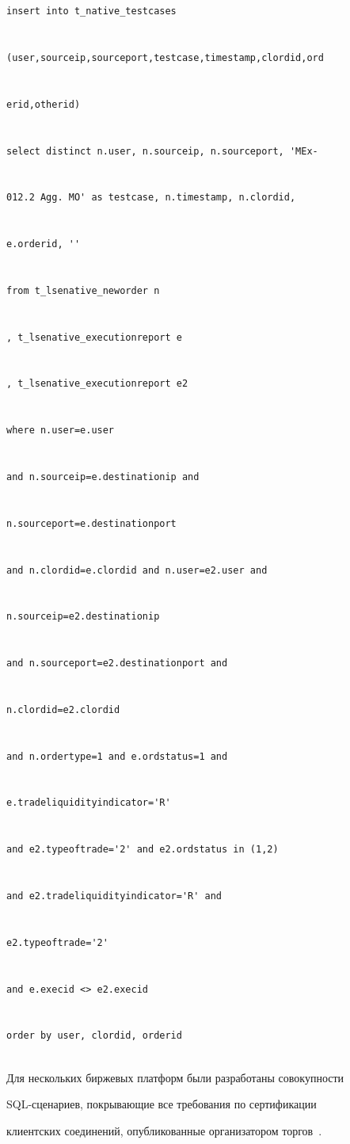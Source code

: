 \begin{verbatim}


insert into t_native_testcases


(user,sourceip,sourceport,testcase,timestamp,clordid,ord


erid,otherid)


select distinct n.user, n.sourceip, n.sourceport, 'MEx-


012.2 Agg. MO' as testcase, n.timestamp, n.clordid,


e.orderid, ''


from t_lsenative_neworder n


, t_lsenative_executionreport e


, t_lsenative_executionreport e2


where n.user=e.user


and n.sourceip=e.destinationip and


n.sourceport=e.destinationport


and n.clordid=e.clordid and n.user=e2.user and


n.sourceip=e2.destinationip


and n.sourceport=e2.destinationport and


n.clordid=e2.clordid


and n.ordertype=1 and e.ordstatus=1 and


e.tradeliquidityindicator='R'


and e2.typeoftrade='2' and e2.ordstatus in (1,2)


and e2.tradeliquidityindicator='R' and


e2.typeoftrade='2'


and e.execid <> e2.execid


order by user, clordid, orderid


\end{verbatim}





\vspace*{-2pt}





Для нескольких биржевых платформ были разработаны совокупности


SQL-сце\-на\-ри\-ев, покрывающие все требования по сертификации


клиентских соединений, опубликованные организатором торгов~\cite{9-al}.






